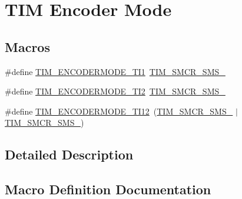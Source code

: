 \hypertarget{group___t_i_m___encoder___mode}{}\section{T\+IM Encoder Mode}
\label{group___t_i_m___encoder___mode}
\subsection*{Macros}
\begin{DoxyCompactItemize}
\item 
\#define \mbox{\hyperlink{group___t_i_m___encoder___mode_gaff047abefa78b0f0a7bbd0f648905d7d}{T\+I\+M\+\_\+\+E\+N\+C\+O\+D\+E\+R\+M\+O\+D\+E\+\_\+\+T\+I1}}~\mbox{\hyperlink{group___peripheral___registers___bits___definition_ga7d1ebece401aeb12abd466d2eafa78b2}{T\+I\+M\+\_\+\+S\+M\+C\+R\+\_\+\+S\+M\+S\+\_}}
\item 
\#define \mbox{\hyperlink{group___t_i_m___encoder___mode_ga9166e985a35358cb3ed942c2a36e018d}{T\+I\+M\+\_\+\+E\+N\+C\+O\+D\+E\+R\+M\+O\+D\+E\+\_\+\+T\+I2}}~\mbox{\hyperlink{group___peripheral___registers___bits___definition_gaa980a3121ab6cda5a4a42b959da8421e}{T\+I\+M\+\_\+\+S\+M\+C\+R\+\_\+\+S\+M\+S\+\_}}
\item 
\#define \mbox{\hyperlink{group___t_i_m___encoder___mode_ga8046f1021dc578551fcff88891239e67}{T\+I\+M\+\_\+\+E\+N\+C\+O\+D\+E\+R\+M\+O\+D\+E\+\_\+\+T\+I12}}~(\mbox{\hyperlink{group___peripheral___registers___bits___definition_gaa980a3121ab6cda5a4a42b959da8421e}{T\+I\+M\+\_\+\+S\+M\+C\+R\+\_\+\+S\+M\+S\+\_}} $\vert$ \mbox{\hyperlink{group___peripheral___registers___bits___definition_ga7d1ebece401aeb12abd466d2eafa78b2}{T\+I\+M\+\_\+\+S\+M\+C\+R\+\_\+\+S\+M\+S\+\_}})
\end{DoxyCompactItemize}


\subsection{Detailed Description}


\subsection{Macro Definition Documentation}
\mbox{\label{group___t_i_m___encoder___mode_gaff047abefa78b0f0a7bbd0f648905d7d}} 
